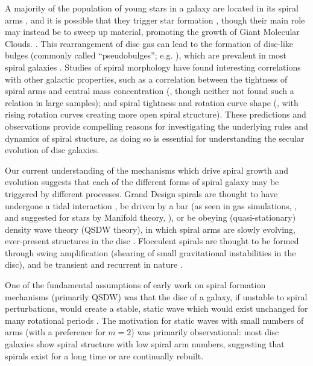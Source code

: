 A majority of the population of young stars in a galaxy are located in its spiral arms \citep{2011EAS....51...19E}, and it is possible that they trigger star formation \citep{2013A&A...560A..59C}, though their main role may instead be to sweep up material, promoting the growth of Giant Molecular Clouds. \citep{2014IAUS..298..221D}. This rearrangement of disc gas can lead to the formation of disc-like bulges (commonly called ``pseudobulges''; e.g. \citealt{2004ARA&A..42..603K}), which are prevalent in most spiral galaxies \citep{2018MNRAS.473.4731K}. Studies of spiral morphology have found interesting correlations with other galactic properties, such as a correlation between the tightness of spiral arms and central mass concentration (\citealt{2019ApJ...871..194Y}, though neither \citealt{2017MNRAS.472.2263H} not \citealt{2019MNRAS.487.1808M} found such a relation in large samples); and spiral tightness and rotation curve shape (\citealt{2005MNRAS.359.1065S}, with rising rotation curves creating more open spiral structure). These predictions and observations provide compelling reasons for investigating the underlying rules and dynamics of spiral stucture, as doing so is essential for understanding the secular evolution of disc galaxies.

Our current understanding of the mechanisms which drive spiral growth and evolution suggests that each of the different forms of spiral galaxy may be triggered by different processes. Grand Design spirals are thought to have undergone a tidal interaction \citep{2010MNRAS.403..625D,2017ApJ...834....7S}, be driven by a bar (as seen in gas simulations, \citealt{1976ApJ...209...53S,2008A&A...489..115R}, and suggested for stars by Manifold theory, \citealt{2006A&A...453...39R,2009MNRAS.394...67A,2009MNRAS.400.1706A}), or be obeying (quasi-stationary) density wave theory (QSDW theory), in which spiral arms are slowly evolving, ever-present structures in the disc \citep{1964ApJ...140..646L}. Flocculent spirals are thought to be formed through swing amplification (shearing of small gravitational instabilities in the disc), and be transient and recurrent in nature \citep{1966ApJ...146..810J}.

One of the fundamental assumptions of early work on spiral formation mechanisms (primarily QSDW) was that the disc of a galaxy, if unstable to spiral perturbations, would create a stable, static wave which would exist unchanged for many rotational periods \citep{1964ApJ...140..646L}. The motivation for static waves with small numbers of arms (with a preference for $m=2$) was primarily observational: most disc galaxies show spiral structure with low spiral arm numbers, suggesting that spirals exist for a long time or are continually rebuilt.

